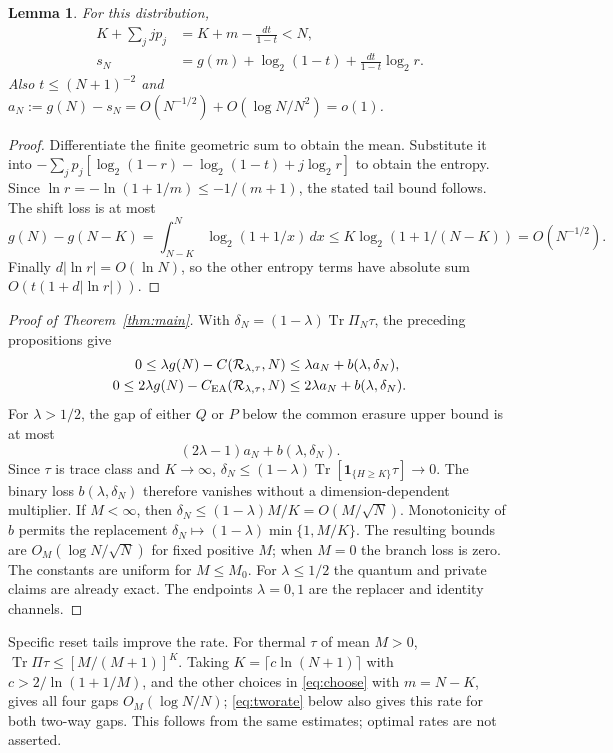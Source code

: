 \documentclass[11pt]{article}
\newtheorem{lemma}[theorem]{Lemma}
\newcommand{\Tr}{\operatorname{Tr}}
\newcommand{\Rcal}{\mathcal R_{\lambda,\tau}}
\begin{document}
\begin{lemma}\label{lem:geom}
For this distribution,
\begin{align}
 K+\sum_jjp_j&=K+m-\frac{dt}{1-t}<N,\label{eq:mean}\\
 s_N&=g(m)+\log_2(1-t)+\frac{dt}{1-t}\log_2r.\label{eq:entropy}
\end{align}
Also $t\le(N+1)^{-2}$ and
$a_N:=g(N)-s_N=O(N^{-1/2})+O(\log N/N^2)=o(1)$.
\end{lemma}
\begin{proof}
Differentiate the finite geometric sum to obtain the mean.
Substitute it into
$-\sum_jp_j[\log_2(1-r)-\log_2(1-t)+j\log_2r]$
to obtain the entropy. Since
$\ln r=-\ln(1+1/m)\le-1/(m+1)$, the stated tail bound follows.
The shift loss is at most
\[
 g(N)-g(N-K)=\int_{N-K}^N\log_2(1+1/x)\,dx
 \le K\log_2(1+1/(N-K))=O(N^{-1/2}).
\]
Finally $d|\ln r|=O(\ln N)$, so the other entropy terms have
absolute sum $O(t(1+d|\ln r|))$.
\end{proof}

\begin{proof}[Proof of Theorem~\ref{thm:main}]
With $\delta_N=(1-\lambda)\Tr\Pi_N\tau$, the preceding propositions give
\begin{align}
0\le\lambda g(N)-C(\Rcal,N)&\le\lambda a_N+b(\lambda,\delta_N),\label{eq:gapc}\\
0\le2\lambda g(N)-C_{\rm EA}(\Rcal,N)&\le2\lambda a_N+b(\lambda,\delta_N).\label{eq:gapea}
\end{align}
For $\lambda>1/2$, the gap of either $Q$ or $P$ below the common
erasure upper bound is at most
\begin{equation}\label{eq:gapq}
 (2\lambda-1)a_N+b(\lambda,\delta_N).
\end{equation}
Since $\tau$ is trace class and $K\to\infty$,
$\delta_N\le(1-\lambda)\Tr[\mathbf1_{\{H\ge K\}}\tau]\to0$.
The binary loss $b(\lambda,\delta_N)$ therefore vanishes without a
dimension-dependent multiplier.
If $M<\infty$, then $\delta_N\le(1-\lambda)M/K=O(M/\sqrt N)$.
Monotonicity of $b$ permits the replacement
$\delta_N\mapsto(1-\lambda)\min\{1,M/K\}$.
The resulting bounds are $O_M(\log N/\sqrt N)$ for fixed positive $M$;
when $M=0$ the branch loss is zero. The constants are uniform for $M\le M_0$.
For $\lambda\le1/2$ the quantum and private claims are already exact.
The endpoints $\lambda=0,1$ are the replacer and identity channels.
\end{proof}

Specific reset tails improve the rate. For thermal $\tau$ of mean $M>0$,
$\Tr\Pi\tau\le[M/(M+1)]^K$.
Taking $K=\lceil c\ln(N+1)\rceil$ with $c>2/\ln(1+1/M)$,
and the other choices in \eqref{eq:choose} with $m=N-K$, gives
all four gaps $O_M(\log N/N)$; \eqref{eq:tworate} below
also gives this rate for both two-way gaps.
This follows from the same estimates; optimal rates are not asserted.
\end{document}
